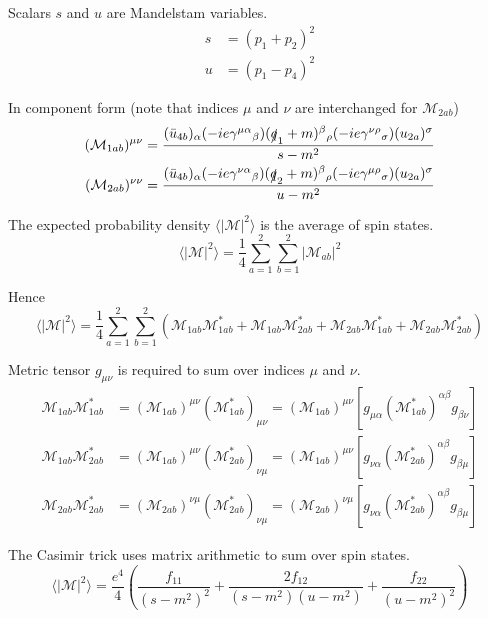 Scalars $s$ and $u$ are Mandelstam variables.
\begin{align*}
s&=(p_1+p_2)^2
\\
u&=(p_1-p_4)^2
\end{align*}

In component form (note that indices $\mu$ and $\nu$ are interchanged for $\mathcal M_{2ab}$)
\begin{align*}
(\mathcal M_{1ab})^{\mu\nu}&=\frac{
(\bar{u}_{4b})_\alpha
(-ie\gamma^{\mu\alpha}{}_\beta)
(\slashed{q}_1+m)^\beta{}_\rho
(-ie\gamma^{\nu\rho}{}_\sigma)
(u_{2a})^\sigma}{s-m^2}
\\
(\mathcal M_{2ab})^{\nu\nu}&=\frac{
(\bar{u}_{4b})_\alpha
(-ie\gamma^{\nu\alpha}{}_\beta)
(\slashed{q}_2+m)^\beta{}_\rho
(-ie\gamma^{\mu\rho}{}_\sigma)
(u_{2a})^\sigma}{u-m^2}
\end{align*}

The expected probability density $\langle|\mathcal M|^2\rangle$
is the average of spin states.
\begin{equation*}
\langle|\mathcal M|^2\rangle=\frac{1}{4}\sum_{a=1}^2\sum_{b=1}^2|\mathcal M_{ab}|^2
\end{equation*}

Hence
\begin{equation*}
\langle|\mathcal{M}|^2\rangle
=\frac{1}{4}\sum_{a=1}^2\sum_{b=1}^2
\left(
\mathcal M_{1ab}\mathcal M_{1ab}^*
+\mathcal M_{1ab}\mathcal M_{2ab}^*+\mathcal M_{2ab}\mathcal M_{1ab}^*
+\mathcal M_{2ab}\mathcal M_{2ab}^*
\right)
\end{equation*}

Metric tensor $g_{\mu\nu}$ is required to sum over indices $\mu$ and $\nu$.
\begin{align*}
\mathcal M_{1ab}\mathcal M_{1ab}^*&=(\mathcal M_{1ab})^{\mu\nu}(\mathcal M_{1ab}^*)_{\mu\nu}
=(\mathcal M_{1ab})^{\mu\nu}\left[g_{\mu\alpha}(\mathcal M_{1ab}^*)^{\alpha\beta}g_{\beta\nu}\right]
\\
\mathcal M_{1ab}\mathcal M_{2ab}^*&=(\mathcal M_{1ab})^{\mu\nu}(\mathcal M_{2ab}^*)_{\nu\mu}
=(\mathcal M_{1ab})^{\mu\nu}\left[g_{\nu\alpha}(\mathcal M_{2ab}^*)^{\alpha\beta}g_{\beta\mu}\right]
\\
\mathcal M_{2ab}\mathcal M_{2ab}^*&=(\mathcal M_{2ab})^{\nu\mu}(\mathcal M_{2ab}^*)_{\nu\mu}
=(\mathcal M_{2ab})^{\nu\mu}\left[g_{\nu\alpha}(\mathcal M_{2ab}^*)^{\alpha\beta}g_{\beta\mu}\right]
\end{align*}

The Casimir trick uses matrix arithmetic to sum over spin states.
\begin{equation*}
\langle|\mathcal{M}|^2\rangle
=
\frac{e^4}{4}
\left(
\frac{f_{11}}{(s-m^2)^2}
+\frac{2f_{12}}{(s-m^2)(u-m^2)}
+\frac{f_{22}}{(u-m^2)^2}
\right)
\tag{1}
\end{equation*}

